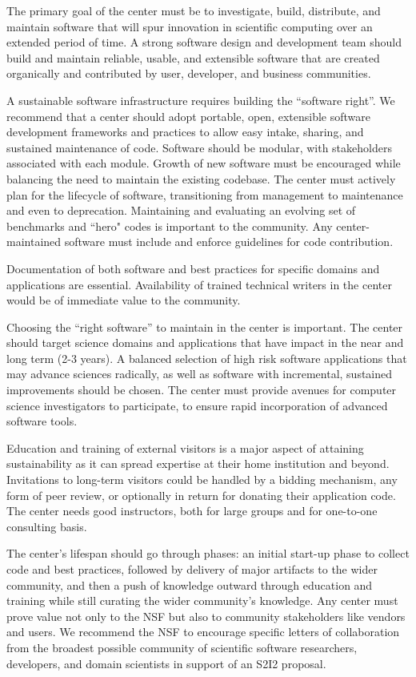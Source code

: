 The primary goal of the center must be to investigate, build, distribute, and maintain software that will spur innovation in scientific computing over an extended period of time. 
A strong software design and development team should build and maintain reliable, usable, and extensible software that are created organically and contributed by user, developer, and business communities.

A sustainable software infrastructure requires building the ``software right''. 
We recommend that a center should adopt portable, open, extensible software development frameworks and practices to allow easy intake, sharing, and sustained maintenance of code. 
Software should be modular, with stakeholders associated with each module. Growth of new software must be encouraged while balancing the need to maintain the existing codebase. 
The center must actively plan for the lifecycle of software, transitioning from management to maintenance and even to deprecation. 
Maintaining and evaluating an evolving set of benchmarks and ``hero" codes is important to the community.
Any center-maintained software must include and enforce guidelines for code contribution.

Documentation of both software and best practices for specific domains and applications are essential. Availability of trained technical writers in the center would be of immediate value to the community.

Choosing the ``right software'' to maintain in the center is important. 
The center should target science domains and applications that have impact in the near and long term (2-3 years). 
A balanced selection of high risk software applications that may advance sciences radically, as well as software with incremental, sustained improvements should be chosen. 
The center must provide avenues for computer science investigators to participate, to ensure rapid incorporation of advanced software tools.

Education and training of external visitors is a major aspect of attaining sustainability as it can spread expertise at their home institution and beyond. 
Invitations to long-term visitors could be handled by a bidding mechanism, any form of peer review, or optionally in return for donating their application code. 
The center needs good instructors, both for large groups and for one-to-one consulting basis.

The center's lifespan should go through phases: an initial start-up phase to collect code and best practices, followed by delivery of major artifacts to the wider community, and then a push of knowledge outward through education and training while still curating the wider community's knowledge. 
Any center must prove value not only to the NSF but also to community stakeholders like vendors and users. 
We recommend the NSF to encourage specific letters of collaboration from the broadest possible community of scientific software researchers, developers, and domain scientists in support of an S2I2 proposal.



